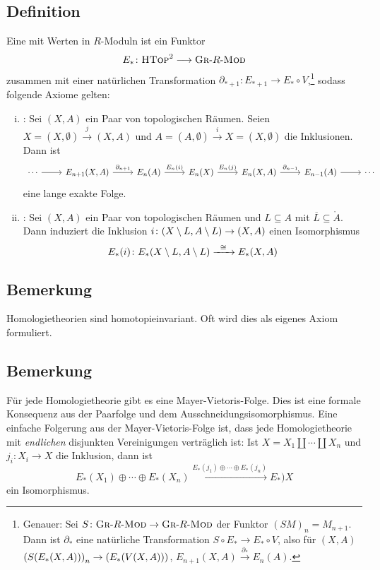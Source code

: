 \subsection[Definition: Homologietheorie]{Definition} %
\label{sub:142}
Eine  mit Werten in $R$-Moduln ist ein Funktor 
\[
	E_* \colon \textsc{HTop}^2 \longrightarrow \textsc{Gr}\text{-}R\text{-}\textsc{Mod}
\]
zusammen mit einer natürlichen Transformation $\partial_{*+1} \colon E_{*+1}  \to E_{*} \circ V$,\footnote{Genauer: Sei 
$S \colon \textsc{Gr}\text{-}R\text{-}\textsc{Mod} \to \textsc{Gr}\text{-}R\text{-}\textsc{Mod}$ der Funktor $(S M)_n = M_{n+1}$. Dann ist $\partial_*$ eine natürliche Transformation
$S \circ E_* \to E_* \circ V$, also für $(X,A)$ $\enbrace*{S \enbrace*{E_*(X,A)}}_n \to \enbrace*{E_* \enbrace*{V(X,A)}}$, $E_{n+1}(X,A) \xrightarrow{\partial_*}E_n(A)$.}  
sodass folgende Axiome gelten:
\begin{enumerate}[(i)]
	\item {}: Sei $(X,A)$ ein Paar von topologischen Räumen. Seien $X= (X,\emptyset) \xrightarrow{j} (X,A)$ und 
	$A= (A,\emptyset) \xrightarrow{i} X=(X,\emptyset)$ die Inklusionen. Dann ist 
	\[
		\begin{tikzcd}
			\cdots \rar & E_{n+1}(X,A) \rar["\partial_{n+1}"] & E_n(A) \rar["E_n(i)"] & E_n(X) \rar["E_n(j)"] & E_n(X,A) \rar["\partial_{n-1}"] & E_{n-1}(A) \rar & \cdots
		\end{tikzcd}
	\] 
	eine lange exakte Folge.
	\item {}: Sei $(X,A)$ ein Paar von topologischen Räumen und $L \subseteq A$ mit $\overline{L} \subseteq \mathring{A}$. Dann induziert die Inklusion
	$i \colon \enbrace*{X \setminus L, A \setminus L} \to (X,A)$ einen Isomorphismus
	\[
		E_*(i) \colon E_* \enbrace*{X \setminus L, A \setminus L} \xrightarrow{\enspace \cong \enspace} E_*(X,A)  
	\] 
\end{enumerate}

\subsection[Bemerkung zur Homotopieinvarianz von Homologietheorien]{Bemerkung} %
\label{sub:143}
Homologietheorien sind homotopieinvariant. Oft wird dies als eigenes Axiom formuliert.

\subsection[Bemerkung zu Mayer-Vietoris-Folge und disjunkten Vereinigungen]{Bemerkung} %
\label{sub:144}
Für jede Homologietheorie gibt es eine Mayer-Vietoris-Folge. Dies ist eine formale Konsequenz aus der Paarfolge und dem Ausschneidungsisomorphismus. Eine einfache Folgerung 
aus der Mayer-Vietoris-Folge ist, dass jede Homologietheorie mit \emph{endlichen} disjunkten Vereinigungen verträglich ist: Ist $X= X_1 \amalg \cdots \amalg X_n$ und
$j_i \colon X_i \to X$ die Inklusion, dann ist 
\[
	E_*(X_1) \oplus \cdots \oplus E_*(X_n) \xrightarrow{E_*(j_1) \oplus \cdots \oplus E_*(j_n)} E_*)X
\]
ein Isomorphismus.

